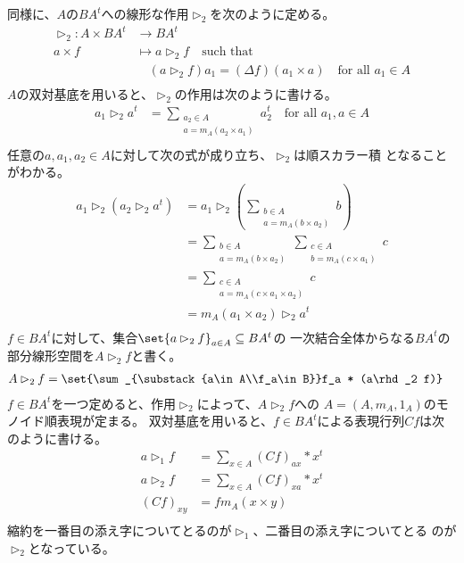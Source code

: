 	同様に、$A$の$BA^t$への線形な作用$\rhd_2$を次のように定める。
	\begin{equation}\begin{split} %
		\rhd_2: A\times BA^t &\to BA^t \\
			a\times f &\mapsto a\rhd_2 f \quad\text{such that} \\ 
				&\quad (a\rhd_2 f)a_1 = (\Delta f)(a_1\times a) \quad \text{for all }a_1\in A \\
	\end{split}\end{equation} %
	$A$の双対基底を用いると、$\rhd_2$の作用は次のように書ける。
	\begin{equation}\begin{split} %
		a_1\rhd_2 a^t &= \sum_{\substack{a_2\in A\\a=m_A(a_2\times a_1)}}a_2^t
			\quad \text{for all }a_1,a\in A \\
	\end{split}\end{equation} %
	任意の$a,a_1,a_2\in A$に対して次の式が成り立ち、$\rhd_2$は順スカラー積
	となることがわかる。
	\begin{equation}\begin{split} %
		a_1\rhd_2(a_2\rhd_2 a^t) 
			&= a_1\rhd_2(\sum_{\substack{b\in A\\a=m_A(b\times a_2)}}b) \\
			&= \sum_{\substack{b\in A\\a=m_A(b\times a_2)}} \sum_{\substack{c\in A\\b=m_A(c\times a_1)}}c \\
			&= \sum_{\substack{c\in A\\a=m_A(c\times a_1\times a_2)}}c \\
			&= m_A(a_1\times a_2)\rhd_2 a^t \\
	\end{split}\end{equation} %
	$f\in BA^t$に対して、集合$\set{a\rhd_2 f}_{a\in A}\subseteq BA^t$の
	一次結合全体からなる$BA^t$の部分線形空間を$A\rhd_2 f$と書く。
	\begin{equation}\begin{split} %
		A\rhd_2 f &= \set{\sum_{\substack{a\in A\\f_a\in B}}f_a * (a\rhd_2 f)}
	\end{split}\end{equation} %
	$f\in BA^t$を一つ定めると、作用$\rhd_2$によって、$A\rhd_2 f$への
	$A=(A,m_A,1_A)$のモノイド順表現が定まる。
	双対基底を用いると、$f\in BA^t$による表現行列$Cf$は次のように書ける。
	\begin{equation}\begin{split} %
		a\rhd_1 f &= \sum_{x\in A}(Cf)_{ax}*x^t \\
		a\rhd_2 f &= \sum_{x\in A}(Cf)_{xa}*x^t \\
		(Cf)_{xy} &= fm_A(x\times y) \\
	\end{split}\end{equation} %
	縮約を一番目の添え字についてとるのが$\rhd_1$、二番目の添え字についてとる
	のが$\rhd_2$となっている。

